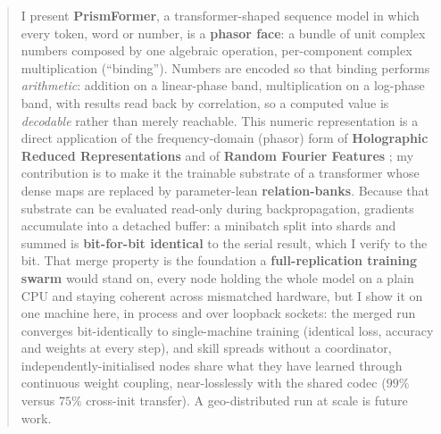 \documentclass[11pt]{article}
\begin{document}
\begin{abstract}
I present \textbf{PrismFormer}, a transformer-shaped sequence model in which every token, word or
number, is a \textbf{phasor face}: a bundle of unit complex numbers composed by one algebraic
operation, per-component complex multiplication (``binding''). Numbers are encoded so that binding
performs \emph{arithmetic}: addition on a linear-phase band, multiplication on a log-phase band, with
results read back by correlation, so a computed value is \emph{decodable} rather than merely reachable.
This numeric representation is a direct application of the frequency-domain (phasor) form of
\textbf{Holographic Reduced Representations} \parencite{plate1995hrr,plate2003hrr} and of \textbf{Random Fourier Features}
\parencite{rahimi2007random}; my contribution is to make it the trainable substrate of a transformer whose
dense maps are replaced by parameter-lean \textbf{relation-banks}. Because that substrate can be
evaluated read-only during backpropagation, gradients accumulate into a detached buffer: a minibatch
split into shards and summed is \textbf{bit-for-bit identical} to the serial result, which I verify to the
bit. That merge property is the foundation a \textbf{full-replication training swarm} would stand on,
every node holding the whole model on a plain CPU and staying coherent across mismatched hardware, but I
show it on one machine here, in process and over loopback sockets: the merged run converges
bit-identically to single-machine training (identical loss, accuracy and weights at every step), and skill
spreads without a coordinator, independently-initialised nodes share what they have learned through
continuous weight coupling, near-losslessly with the shared codec ($99\%$ versus $75\%$ cross-init
transfer). A geo-distributed run at scale is future work.


\end{abstract}
\end{document}
